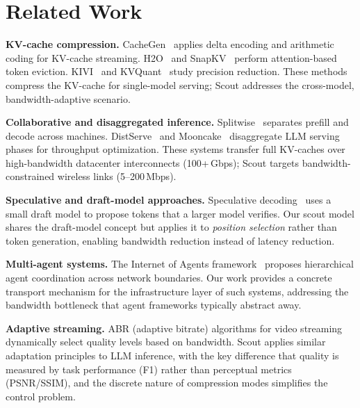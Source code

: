 \documentclass[conference]{IEEEtran}
\begin{document}
\section{Related Work}
\label{sec:related}

\textbf{KV-cache compression.}
CacheGen~\cite{cachegen} applies delta encoding and arithmetic coding for KV-cache streaming.
H2O~\cite{h2o} and SnapKV~\cite{snapkv} perform attention-based token eviction.
KIVI~\cite{kivi} and KVQuant~\cite{kvquant} study precision reduction.
These methods compress the KV-cache for single-model serving; Scout addresses the cross-model, bandwidth-adaptive scenario.

\textbf{Collaborative and disaggregated inference.}
Splitwise~\cite{splitwise} separates prefill and decode across machines.
DistServe~\cite{distserve} and Mooncake~\cite{mooncake} disaggregate LLM serving phases for throughput optimization.
These systems transfer full KV-caches over high-bandwidth datacenter interconnects (100+\,Gbps); Scout targets bandwidth-constrained wireless links (5--200\,Mbps).

\textbf{Speculative and draft-model approaches.}
Speculative decoding~\cite{speculativedecoding} uses a small draft model to propose tokens that a larger model verifies.
Our scout model shares the draft-model concept but applies it to \emph{position selection} rather than token generation, enabling bandwidth reduction instead of latency reduction.

\textbf{Multi-agent systems.}
The Internet of Agents framework~\cite{ioa} proposes hierarchical agent coordination across network boundaries.
Our work provides a concrete transport mechanism for the infrastructure layer of such systems, addressing the bandwidth bottleneck that agent frameworks typically abstract away.

\textbf{Adaptive streaming.}
ABR (adaptive bitrate) algorithms for video streaming~\cite{abr} dynamically select quality levels based on bandwidth.
Scout applies similar adaptation principles to LLM inference, with the key difference that quality is measured by task performance (F1) rather than perceptual metrics (PSNR/SSIM), and the discrete nature of compression modes simplifies the control problem.


\end{document}

